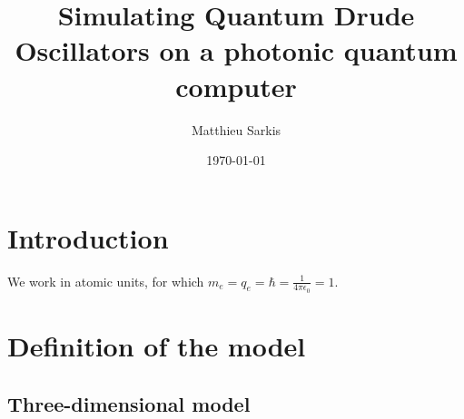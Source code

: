 \documentclass[reprint, amsmath, amssymb, aps]{revtex4-2}
\begin{document}
\preprint{}

\title{Simulating Quantum Drude Oscillators on a photonic quantum computer}

\author{Matthieu Sarkis}

\author{}
\email{}
\affiliation{
}


\date{\today}

\begin{abstract}
\end{abstract}

\maketitle



\section{Introduction}

    We work in atomic units, for which $m_e=q_e=\hbar=\frac{1}{4\pi\epsilon_0}=1$.

\section{Definition of the model}

    \subsection{Three-dimensional model}
\end{document}
